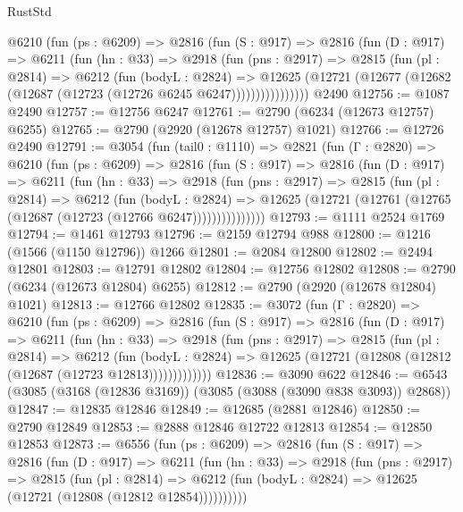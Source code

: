 \begin{lexlean}{RustStd}
\begin{coremodule}
{\begin{coremodule}
{{{{{{{{{{{{{{{{{{{{{{{{{{        @6210
          (fun (ps : @6209) =>
          @2816
            (fun (S : @917) =>
            @2816
              (fun (D : @917) =>
              @6211
                (fun (hn : @33) =>
                @2918
                  (fun (pns : @2917) =>
                  @2815
                    (fun (pl : @2814) =>
                    @6212
                      (fun (bodyL : @2824) =>
                      @12625
                        (@12721 (@12677 (@12682 (@12687 (@12723 (@12726 @6245 @6247))))))))))))))))
    @2490
@12756 := @1087 @2490
@12757 := @12756 @6247
@12761 := @2790 (@6234 (@12673 @12757) @6255)
@12765 := @2790 (@2920 (@12678 @12757) @1021)
@12766 := @12726 @2490
@12791 := @3054
    (fun (tail0 : @1110) =>
    @2821
      (fun (Γ : @2820) =>
      @6210
        (fun (ps : @6209) =>
        @2816
          (fun (S : @917) =>
          @2816
            (fun (D : @917) =>
            @6211
              (fun (hn : @33) =>
              @2918
                (fun (pns : @2917) =>
                @2815
                  (fun (pl : @2814) =>
                  @6212
                    (fun (bodyL : @2824) =>
                    @12625 (@12721 (@12761 (@12765 (@12687 (@12723 (@12766 @6247)))))))))))))))
@12793 := @1111 @2524 @1769
@12794 := @1461 @12793
@12796 := @2159 @12794 @988
@12800 := @1216 (@1566 (@1150 @12796)) @1266
@12801 := @2084 @12800
@12802 := @2494 @12801
@12803 := @12791 @12802
@12804 := @12756 @12802
@12808 := @2790 (@6234 (@12673 @12804) @6255)
@12812 := @2790 (@2920 (@12678 @12804) @1021)
@12813 := @12766 @12802
@12835 := @3072
    (fun (Γ : @2820) =>
    @6210
      (fun (ps : @6209) =>
      @2816
        (fun (S : @917) =>
        @2816
          (fun (D : @917) =>
          @6211
            (fun (hn : @33) =>
            @2918
              (fun (pns : @2917) =>
              @2815
                (fun (pl : @2814) =>
                @6212
                  (fun (bodyL : @2824) =>
                  @12625 (@12721 (@12808 (@12812 (@12687 (@12723 @12813)))))))))))))
@12836 := @3090 @622
@12846 := @6543 (@3085 (@3168 (@12836 @3169)) (@3085 (@3088 (@3090 @838 @3093)) @2868))
@12847 := @12835 @12846
@12849 := @12685 (@2881 @12846)
@12850 := @2790 @12849
@12853 := @2888 @12846 @12722 @12813
@12854 := @12850 @12853
@12873 := @6556
    (fun (ps : @6209) =>
    @2816
      (fun (S : @917) =>
      @2816
        (fun (D : @917) =>
        @6211
          (fun (hn : @33) =>
          @2918
            (fun (pns : @2917) =>
            @2815
              (fun (pl : @2814) =>
              @6212 (fun (bodyL : @2824) => @12625 (@12721 (@12808 (@12812 @12854))))))))))
}}}}}}}}}}}}}}}}}}}}}}}}}}
\end{coremodule}}
\end{coremodule}
\end{lexlean}
